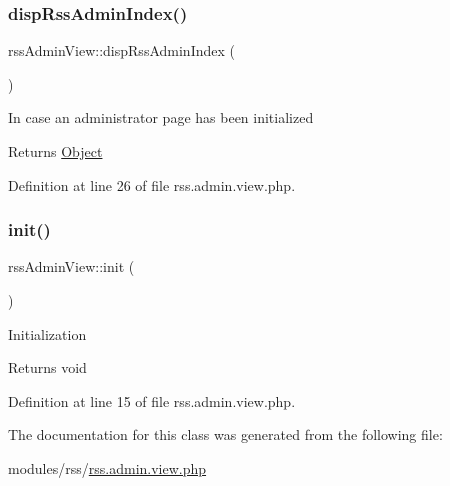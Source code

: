 \subsubsection{\texorpdfstring{disp\+Rss\+Admin\+Index()}{dispRssAdminIndex()}}
{\footnotesize\ttfamily rss\+Admin\+View\+::disp\+Rss\+Admin\+Index (\begin{DoxyParamCaption}{ }\end{DoxyParamCaption})}

In case an administrator page has been initialized

\begin{DoxyReturn}{Returns}
\hyperlink{classObject}{Object} 
\end{DoxyReturn}


Definition at line 26 of file rss.\+admin.\+view.\+php.

\mbox{\label{classrssAdminView_a36015edb6e131ff304bff9140cded3aa}} 
\subsubsection{\texorpdfstring{init()}{init()}}
{\footnotesize\ttfamily rss\+Admin\+View\+::init (\begin{DoxyParamCaption}{ }\end{DoxyParamCaption})}

Initialization

\begin{DoxyReturn}{Returns}
void 
\end{DoxyReturn}


Definition at line 15 of file rss.\+admin.\+view.\+php.



The documentation for this class was generated from the following file\+:\begin{DoxyCompactItemize}
\item 
modules/rss/\hyperlink{rss_8admin_8view_8php}{rss.\+admin.\+view.\+php}\end{DoxyCompactItemize}

